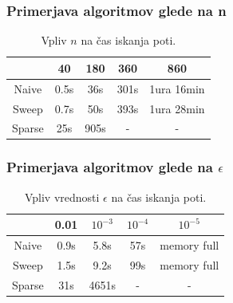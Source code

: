 \documentclass{beamer}
\begin{document}
\begin{frame}
    \frametitle{Primerjava algoritmov glede na n}
    \begin{table}[h]
        \centering
        \begin{tabular}{|c|c|c|c|c|}
            \hline
             & 40 & 180 & 360 & 860 \\
            \hline
            Naive & 0.5s & 36s & 301s & 1ura 16min \\
            \hline
            Sweep & 0.7s & 50s & 393s & 1ura 28min \\
            \hline
            Sparse & 25s & 905s & - & - \\
            \hline
        \end{tabular}
        \caption{Vpliv $n$ na čas iskanja poti.}
    \end{table}
\end{frame}

\begin{frame}
    \frametitle{Primerjava algoritmov glede na $\epsilon$}
    \begin{table}[h]
        \centering
        \begin{tabular}{|c|c|c|c|c|}
            \hline
             & 0.01 & $10^{-3}$ & $10^{-4}$ & $10^{-5}$ \\
            \hline
            Naive & 0.9s & 5.8s & 57s & memory full \\
            \hline
            Sweep & 1.5s & 9.2s & 99s & memory full \\
            \hline
            Sparse & 31s & 4651s & - & - \\
            \hline
        \end{tabular}
        \caption{Vpliv vrednosti $\epsilon$ na čas iskanja poti.}
    \end{table}
\end{frame}
\end{document}
